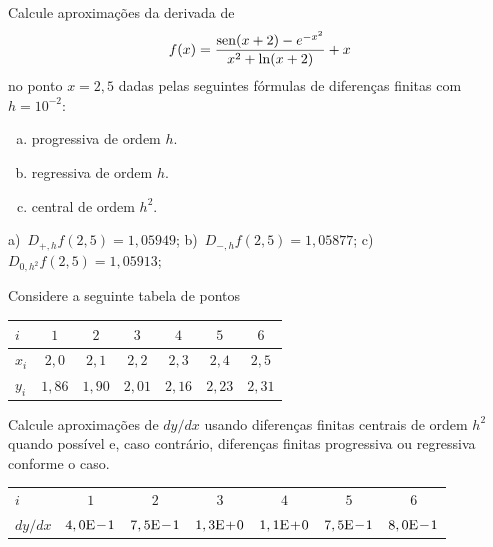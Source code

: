 \begin{exer}\label{exer:df_fun}
  Calcule aproximações da derivada de
  \begin{equation}
    f(x) = \frac{\operatorname{sen}(x+2) - e^{-x^2}}{x^2 + \ln(x+2)}+x
  \end{equation}
no ponto $x=2,5$ dadas pelas seguintes fórmulas de diferenças finitas com $h=10^{-2}$:
\begin{enumerate}[a)]
\item progressiva de ordem $h$.
\item regressiva de ordem $h$.
\item central de ordem $h^2$.
\end{enumerate}
\end{exer}
\begin{resp}
  a)~$D_{+,h}f(2,5)=1,05949$; b)~$D_{-,h}f(2,5)=1,05877$; c)~$D_{0,h^2}f(2,5)=1,05913$;
\end{resp}

\begin{exer}\label{exer:df_tab}
  Considere a seguinte tabela de pontos
  \begin{center}
    \begin{tabular}{l|cccccc}
      $i$ & $1$ & $2$ & $3$ & $4$ & $5$ & $6$ \\\hline
      $x_i$ & $2,0$ & $2,1$ & $2,2$ & $2,3$ & $2,4$ & $2,5$ \\
      $y_i$ & $1,86$ & $1,90$ & $2,01$ & $2,16$ & $2,23$ & $2,31$ \\\hline
    \end{tabular}
  \end{center}
Calcule aproximações de $dy/dx$ usando diferenças finitas centrais de ordem $h^2$ quando possível e, caso contrário, diferenças finitas progressiva ou regressiva conforme o caso.
\end{exer}
\begin{resp}
  \begin{center}
    \begin{tabular}{l|cccccc}\hline
      $i$ & $1$ & $2$ & $3$ & $4$ & $5$ & $6$ \\
      $dy/dx$ & $4,0\mathrm{E}\!-\!1$ & $7,5\mathrm{E}\!-\!1$ & $1,3\mathrm{E}\!+\!0$ & $1,1\mathrm{E}\!+\!0$ & $7,5\mathrm{E}\!-\!1$ & $8,0\mathrm{E}\!-\!1$ \\\hline
    \end{tabular}
  \end{center}
\end{resp}

